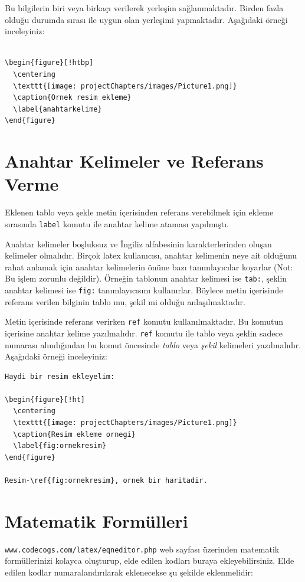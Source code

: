 Bu bilgilerin biri veya birkaçı verilerek yerleşim sağlanmaktadır. Birden fazla olduğu durumda sırası ile uygun olan yerleşimi yapmaktadır. Aşağıdaki örneği inceleyiniz:

\begin{verbatim}

\begin{figure}[!htbp]
  \centering
  \texttt{[image: projectChapters/images/Picture1.png]}
  \caption{Ornek resim ekleme}
  \label{anahtarkelime}
\end{figure}

\end{verbatim}

\section{Anahtar Kelimeler ve Referans Verme}\label{sc:refref}
Eklenen tablo veya şekle metin içerisinden referans verebilmek için ekleme sırasında \texttt{label} komutu ile anahtar kelime ataması yapılmıştı.

Anahtar kelimeler boşluksuz ve İngiliz alfabesinin karakterlerinden oluşan kelimeler olmalıdır. Birçok latex kullanıcısı, anahtar kelimenin neye ait olduğunu rahat anlamak için anahtar kelimelerin önüne bazı tanımlayıcılar koyarlar (Not: Bu işlem zorunlu değildir). Örneğin tablonun anahtar kelimesi ise \texttt{tab:}, şeklin anahtar kelimesi ise \texttt{fig:} tanımlayıcısını kullanırlar. Böylece metin içerisinde referans verilen bilginin tablo mu, şekil mi olduğu anlaşılmaktadır.

Metin içerisinde referans verirken \texttt{ref} komutu kullanılmaktadır. Bu komutun içerisine anahtar kelime yazılmalıdır. \texttt{ref} komutu ile tablo veya şeklin sadece numarası alındığından bu komut öncesinde \textit{tablo} veya \textit{şekil} kelimeleri yazılmalıdır. Aşağıdaki örneği inceleyiniz:

\begin{verbatim}
Haydi bir resim ekleyelim:

\begin{figure}[!ht]
  \centering
  \texttt{[image: projectChapters/images/Picture1.png]}
  \caption{Resim ekleme ornegi}
  \label{fig:ornekresim}
\end{figure}

Resim-\ref{fig:ornekresim}, ornek bir haritadir.
\end{verbatim}

\section{Matematik Formülleri}
\texttt{www.codecogs.com/latex/eqneditor.php} web sayfası üzerinden matematik formüllerinizi kolayca oluşturup, elde edilen kodları buraya ekleyebilirsiniz. Elde edilen kodlar numaralandırılarak eklenecekse şu şekilde eklenmelidir:

